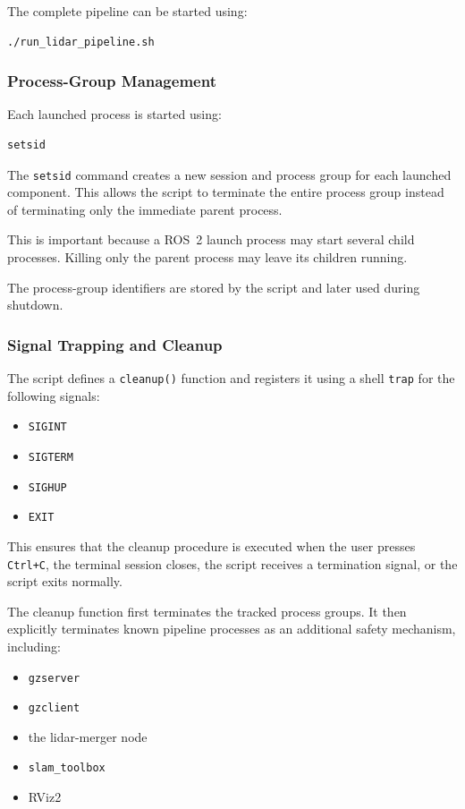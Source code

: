 \documentclass{article}
\begin{document}
The complete pipeline can be started using:

\begin{verbatim}
./run_lidar_pipeline.sh
\end{verbatim}

\subsubsection{Process-Group Management}

Each launched process is started using:

\begin{verbatim}
setsid
\end{verbatim}

The \texttt{setsid} command creates a new session and process group for each launched component. This allows the script to terminate the entire process group instead of terminating only the immediate parent process.

This is important because a ROS~2 launch process may start several child processes. Killing only the parent process may leave its children running.

The process-group identifiers are stored by the script and later used during shutdown.

\subsubsection{Signal Trapping and Cleanup}

The script defines a \texttt{cleanup()} function and registers it using a shell \texttt{trap} for the following signals:

\begin{itemize}
    \item \texttt{SIGINT}
    \item \texttt{SIGTERM}
    \item \texttt{SIGHUP}
    \item \texttt{EXIT}
\end{itemize}

This ensures that the cleanup procedure is executed when the user presses \texttt{Ctrl+C}, the terminal session closes, the script receives a termination signal, or the script exits normally.

The cleanup function first terminates the tracked process groups. It then explicitly terminates known pipeline processes as an additional safety mechanism, including:

\begin{itemize}
    \item \texttt{gzserver}
    \item \texttt{gzclient}
    \item the lidar-merger node
    \item \texttt{slam\_toolbox}
    \item RViz2
\end{itemize}
\end{document}
